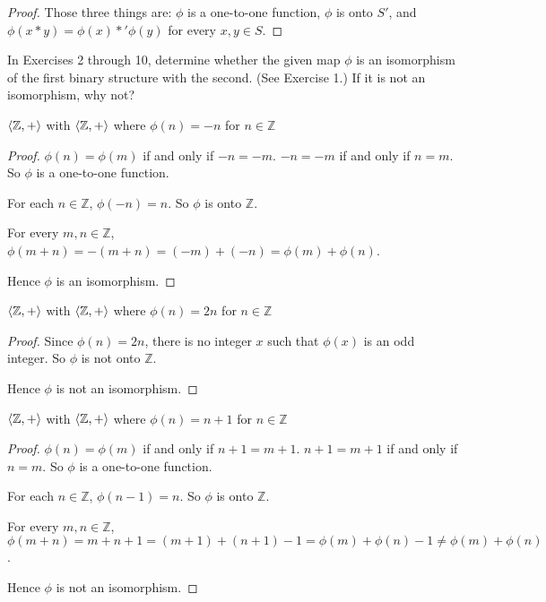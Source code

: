 \begin{proof}
    Those three things are: $\phi$ is a one-to-one function, $\phi$ is onto $S'$, and $\phi(x * y) = \phi(x) *' \phi(y)$ for every $x, y\in S$.
\end{proof}

In Exercises 2 through 10, determine whether the given map $\phi$ is an isomorphism of the first binary structure with the second. (See Exercise 1.) If it is not an isomorphism, why not?

\begin{exercise}
    $\left\langle{\mathbb{Z}, +}\right\rangle$ with $\left\langle{\mathbb{Z}, +}\right\rangle$ where $\phi(n) = -n$ for $n\in\mathbb{Z}$
\end{exercise}

\begin{proof}
    $\phi(n) = \phi(m)$ if and only if $-n = -m$. $-n = -m$ if and only if $n = m$. So $\phi$ is a one-to-one function.

    For each $n\in\mathbb{Z}$, $\phi(-n) = n$. So $\phi$ is onto $\mathbb{Z}$.

    For every $m, n\in\mathbb{Z}$, $\phi(m + n) = -(m + n) = (-m) + (-n) = \phi(m) + \phi(n)$.

    Hence $\phi$ is an isomorphism.
\end{proof}

\begin{exercise}
    $\left\langle{\mathbb{Z}, +}\right\rangle$ with $\left\langle{\mathbb{Z}, +}\right\rangle$ where $\phi(n) = 2n$ for $n\in\mathbb{Z}$
\end{exercise}

\begin{proof}
    Since $\phi(n) = 2n$, there is no integer $x$ such that $\phi(x)$ is an odd integer. So $\phi$ is not onto $\mathbb{Z}$.

    Hence $\phi$ is not an isomorphism.
\end{proof}

\begin{exercise}
    $\left\langle{\mathbb{Z}, +}\right\rangle$ with $\left\langle{\mathbb{Z}, +}\right\rangle$ where $\phi(n) = n + 1$ for $n\in\mathbb{Z}$
\end{exercise}

\begin{proof}
    $\phi(n) = \phi(m)$ if and only if $n + 1 = m + 1$. $n + 1 = m + 1$ if and only if $n = m$. So $\phi$ is a one-to-one function.

    For each $n\in\mathbb{Z}$, $\phi(n - 1) = n$. So $\phi$ is onto $\mathbb{Z}$.

    For every $m, n\in\mathbb{Z}$, $\phi(m + n) = m + n + 1 = (m + 1) + (n + 1) - 1 = \phi(m) + \phi(n) - 1 \ne \phi(m) + \phi(n)$.

    Hence $\phi$ is not an isomorphism.
\end{proof}

